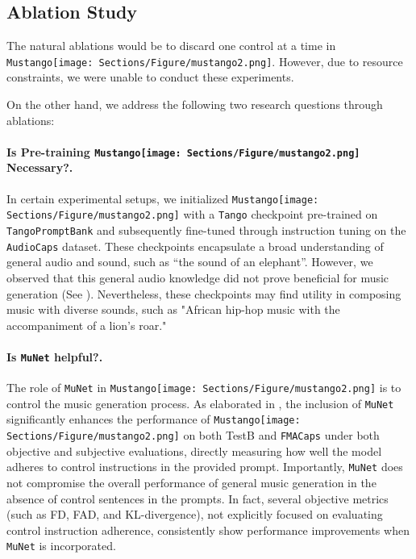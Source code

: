 \documentclass[11pt]{article}
\newcommand{\datasetFMA}{\texttt{FMACaps}}
\newcommand{\model}{\texttt{Mustango}}
\newcommand{\modelemoji}{\model{}\texttt{[image: Sections/Figure/mustango2.png]}}
\begin{document}
\subsection{Ablation Study}

The natural ablations would be to discard one control at a time in \modelemoji{}. However, due to resource constraints, we were unable to conduct these experiments.

On the other hand, we address the following two research questions through ablations:


\paragraph{Is Pre-training \modelemoji{} Necessary?.}
In certain experimental setups, we initialized \modelemoji{} with a \texttt{Tango} checkpoint pre-trained on \texttt{TangoPromptBank} and subsequently fine-tuned through instruction tuning on the \texttt{AudioCaps} dataset. These checkpoints encapsulate a broad understanding of general audio and sound, such as ``the sound of an elephant''. However, we observed that this general audio knowledge did not prove beneficial for music generation (See ). Nevertheless, these checkpoints may find utility in composing music with diverse sounds, such as "African hip-hop music with the accompaniment of a lion's roar."


\paragraph{Is \texttt{MuNet} helpful?.}
The role of \texttt{MuNet} in \modelemoji{} is to control the music generation process.
As elaborated in , the inclusion of \texttt{MuNet} significantly enhances the performance of \modelemoji{} on both TestB and \datasetFMA{} under both objective and subjective evaluations, directly measuring how well the model adheres to control instructions in the provided prompt. Importantly, \texttt{MuNet} does not compromise the overall performance of general music generation in the absence of control sentences in the prompts. In fact, several objective metrics (such as FD, FAD, and KL-divergence), not explicitly focused on evaluating control instruction adherence, consistently show performance improvements when \texttt{MuNet} is incorporated.
\end{document}
